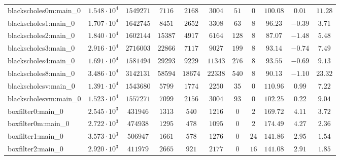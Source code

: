 \begin{tabular}{|l|c|c|c|c|c|c|c|c|c|c|}
blackscholes0m:main\_0         & $ 1.548 \cdot 10^{4} $ & $ 1549271  $ & $ 7116   $ & $ 2168   $ & $ 3004   $ & $ 51   $ & $ 0    $ & $ 100.08      $ & $ 0.01    $ & $ 11.28   $ \\
blackscholes1:main\_0          & $ 1.707 \cdot 10^{4} $ & $ 1642745  $ & $ 8451   $ & $ 2652   $ & $ 3308   $ & $ 63   $ & $ 8    $ & $ 96.23       $ & $ -0.39   $ & $ 3.71    $ \\
blackscholes2:main\_0          & $ 1.840 \cdot 10^{4} $ & $ 1602144  $ & $ 15387  $ & $ 4917   $ & $ 6164   $ & $ 128  $ & $ 8    $ & $ 87.07       $ & $ -1.48   $ & $ 5.48    $ \\
blackscholes3:main\_0          & $ 2.916 \cdot 10^{4} $ & $ 2716003  $ & $ 22866  $ & $ 7117   $ & $ 9027   $ & $ 199  $ & $ 8    $ & $ 93.14       $ & $ -0.74   $ & $ 7.49    $ \\
blackscholes4:main\_0          & $ 1.691 \cdot 10^{4} $ & $ 1581494  $ & $ 29293  $ & $ 9229   $ & $ 11343  $ & $ 276  $ & $ 8    $ & $ 93.55       $ & $ -0.69   $ & $ 9.13    $ \\
blackscholes8:main\_0          & $ 3.486 \cdot 10^{4} $ & $ 3142131  $ & $ 58594  $ & $ 18674  $ & $ 22338  $ & $ 540  $ & $ 8    $ & $ 90.13       $ & $ -1.10   $ & $ 23.32   $ \\
blackscholesv:main\_0          & $ 1.391 \cdot 10^{4} $ & $ 1543680  $ & $ 5799   $ & $ 1774   $ & $ 2250   $ & $ 35   $ & $ 0    $ & $ 110.96      $ & $ 0.99    $ & $ 7.22    $ \\
blackscholesvm:main\_0         & $ 1.523 \cdot 10^{4} $ & $ 1557271  $ & $ 7099   $ & $ 2156   $ & $ 3004   $ & $ 93   $ & $ 0    $ & $ 102.25      $ & $ 0.22    $ & $ 9.04    $ \\
boxfilter0:main\_0             & $ 2.545 \cdot 10^{3} $ & $ 431946   $ & $ 1313   $ & $ 540    $ & $ 1216   $ & $ 0    $ & $ 2    $ & $ 169.72      $ & $ 4.11    $ & $ 3.72    $ \\
boxfilter0m:main\_0            & $ 2.722 \cdot 10^{3} $ & $ 474938   $ & $ 1295   $ & $ 478    $ & $ 1095   $ & $ 0    $ & $ 2    $ & $ 174.49      $ & $ 4.27    $ & $ 2.36    $ \\
boxfilter1:main\_0             & $ 3.573 \cdot 10^{3} $ & $ 506947   $ & $ 1661   $ & $ 578    $ & $ 1276   $ & $ 0    $ & $ 24   $ & $ 141.86      $ & $ 2.95    $ & $ 1.54    $ \\
boxfilter2:main\_0             & $ 2.920 \cdot 10^{3} $ & $ 411979   $ & $ 2665   $ & $ 921    $ & $ 2177   $ & $ 0    $ & $ 16   $ & $ 141.08      $ & $ 2.91    $ & $ 1.85    $ \\

\end{tabular}
